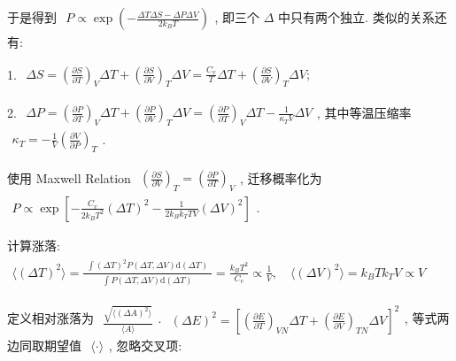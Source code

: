 \documentclass[../../main.tex]{subfiles}
\begin{document}
于是得到 $\begin{aligned}
    P\propto \exp{\left(-\frac{\Delta T\Delta S-\Delta P\Delta V}{2k_{B}T}\right)}
\end{aligned}$, 即三个 $\Delta$ 中只有两个独立. 类似的关系还有: 

1. $\begin{aligned}
    \Delta S = \left(\frac{\partial S}{\partial T}\right)_{V}\Delta T + \left(\frac{\partial S}{\partial V}\right)_{T}\Delta V = \frac{C_{v}}{T}\Delta T + \left(\frac{\partial S}{\partial V}\right)_{T}\Delta V;
\end{aligned}$

2. $\begin{aligned}
    \Delta P = \left(\frac{\partial P}{\partial T}\right)_{V}\Delta T + \left(\frac{\partial P}{\partial V}\right)_{T}\Delta V = \left(\frac{\partial P}{\partial T}\right)_{V}\Delta T - \frac{1}{\kappa_{T}V}\Delta V
\end{aligned}$, 其中等温压缩率 $\begin{aligned}
    \kappa_{T} = -\frac{1}{V}\left(\frac{\partial V}{\partial P}\right)_{T}
\end{aligned}$.

使用 Maxwell Relation $\begin{aligned}
    \left(\frac{\partial S}{\partial V}\right)_{T} = \left(\frac{\partial P}{\partial T}\right)_{V}
\end{aligned}$, 迁移概率化为 $\begin{aligned}
    P\propto \exp{\left[
        -\frac{C_{v}}{2k_{B}T^{2}}(\Delta T)^{2} - \frac{1}{2k_{B}k_{T}TV}\left(\Delta V\right)^{2}
    \right]}
\end{aligned}$. 

计算涨落: $\begin{aligned}
    \langle (\Delta T)^{2}\rangle = \frac{\begin{aligned}
        \int (\Delta T)^{2}P(\Delta T,\Delta V)\mathrm{d}(\Delta T)
    \end{aligned}}{\begin{aligned}
        \int P(\Delta T,\Delta V)\mathrm{d}(\Delta T)
    \end{aligned}} = \frac{k_{B}T^{2}}{C_{v}}\propto \frac{1}{V},\quad \langle (\Delta V)^{2}\rangle = k_{B}Tk_{T}V\propto V
\end{aligned}$

定义相对涨落为 $\begin{aligned}
    \frac{\sqrt{\langle(\Delta A)^{2}\rangle}}{\langle A\rangle}
\end{aligned}$. $\begin{aligned}
    (\Delta E)^{2} = \left[\left(\frac{\partial E}{\partial T}\right)_{VN}\Delta T + \left(\frac{\partial E}{\partial V}\right)_{TN}\Delta V\right]^{2}
\end{aligned}$, 等式两边同取期望值 $\begin{aligned}
    \langle\cdot\rangle
\end{aligned}$, 忽略交叉项: 
\end{document}
